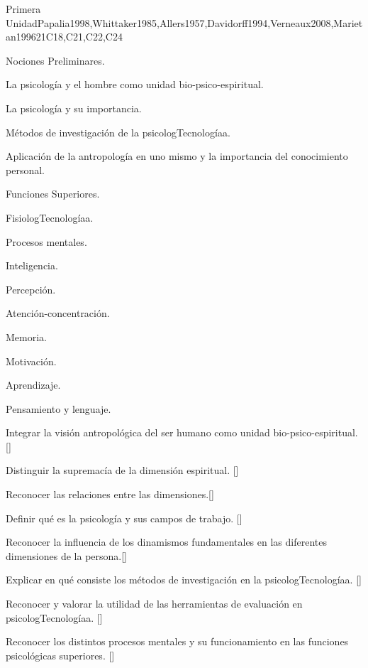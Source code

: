 \begin{syllabus}
\begin{unit}{}{Primera Unidad}{Papalia1998,Whittaker1985,Allers1957,Davidorff1994,Verneaux2008,Marietan1996}{21}{C18,C21,C22,C24}
\begin{topics}
	\item Nociones Preliminares.
	      \begin{subtopics}
		\item La psicología y el hombre como unidad bio-psico-espiritual.
		\item La psicología y su importancia.
		\item Métodos de investigación de la psicologTecnologíaa.
		\item Aplicación de la antropología en uno mismo y la importancia del conocimiento personal.
	      \end{subtopics}
	\item Funciones Superiores.
	      \begin{subtopics}
		\item FisiologTecnologíaa.
		\item Procesos mentales.
		    \begin{subtopics}
			\item	Inteligencia.
			\item Percepción.
			\item Atención-concentración.
			\item Memoria.
			\item Motivación.
			\item Aprendizaje.
			\item Pensamiento y lenguaje.
		    \end{subtopics}    
	      \end{subtopics}

\end{topics}
\begin{learningoutcomes}
	\item Integrar la visión antropológica del ser humano como unidad bio-psico-espiritual. [\Usage]
	\item Distinguir la supremacía de la dimensión espiritual. [\Familiarity]
	\item Reconocer las relaciones entre las dimensiones.[\Familiarity]
	\item Definir qué es la psicología y sus campos de trabajo. [\Familiarity]
	\item Reconocer la influencia de los dinamismos fundamentales en las diferentes dimensiones de la persona.[\Familiarity]
	\item Explicar en qué consiste los métodos de investigación en la psicologTecnologíaa. [\Familiarity]
	\item Reconocer y valorar la utilidad de las herramientas de evaluación en psicologTecnologíaa. [\Familiarity]
	\item Reconocer los distintos procesos mentales y su funcionamiento en las funciones psicológicas superiores. [\Familiarity]
\end{learningoutcomes}
\end{unit}


\end{syllabus}
